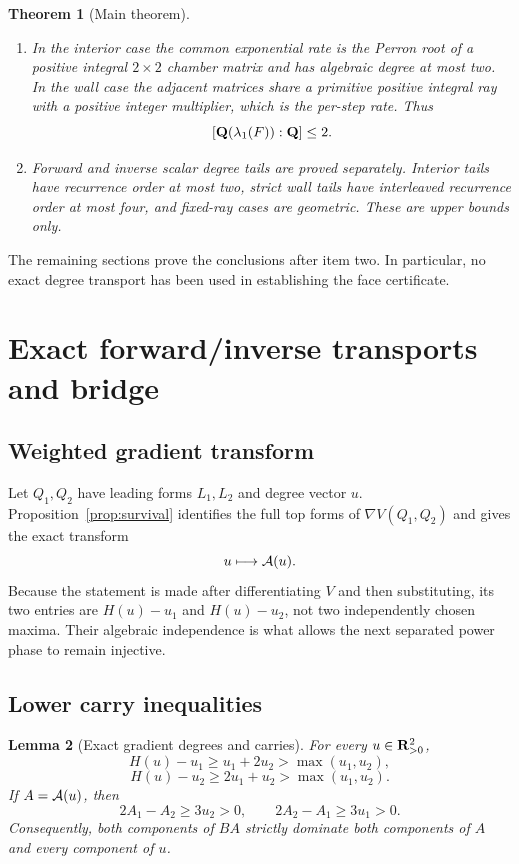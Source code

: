 \documentclass[11pt]{article}
\newtheorem{theorem}{Theorem}[section]
\newtheorem{lemma}[theorem]{Lemma}
\theoremstyle{definition}
\theoremstyle{remark}
\begin{document}
\begin{theorem}[Main theorem]
\begin{enumerate}
adjacent exponents off the wall and by the full face on it.  There is no
nontrivial numerical periodic orbit.
\item In the interior case the common exponential rate is the Perron root
of a positive integral \(2\times2\) chamber matrix and has algebraic
degree at most two.  In the wall case the adjacent matrices share a
primitive positive integral ray with a positive integer multiplier, which
is the per-step rate.  Thus
\[
[\mathbf{Q}(\lambda_1(F)):\mathbf{Q}]\leq2.
\]
\item Forward and inverse scalar degree tails are proved separately.
Interior tails have recurrence order at most two, strict wall tails have
interleaved recurrence order at most four, and fixed-ray cases are
geometric.  These are upper bounds only.
\end{enumerate}
\end{theorem}

The remaining sections prove the conclusions after item two.  In
particular, no exact degree transport has been used in establishing the
face certificate.

\section{Exact forward/inverse transports and bridge}

\subsection{Weighted gradient transform}

Let \(Q_1,Q_2\) have leading forms \(L_1,L_2\) and degree vector \(u\).
Proposition~\ref{prop:survival} identifies the full top forms of
\(\nabla V(Q_1,Q_2)\) and gives the exact transform
\[
u\longmapsto\mathcal{A}(u).
\]
Because the statement is made after differentiating \(V\) and then
substituting, its two entries are \(H(u)-u_1\) and \(H(u)-u_2\), not two
independently chosen maxima.  Their algebraic independence is what allows
the next separated power phase to remain injective.

\subsection{Lower carry inequalities}

\begin{lemma}[Exact gradient degrees and carries]\label{lem:carries}
For every \(u\in\mathbf{R}_{>0}^2\),
\[
H(u)-u_1\geq u_1+2u_2>\max(u_1,u_2),
\]
\[
H(u)-u_2\geq2u_1+u_2>\max(u_1,u_2).
\]
If \(A=\mathcal{A}(u)\), then
\[
2A_1-A_2\geq3u_2>0,\qquad
2A_2-A_1\geq3u_1>0.
\]
Consequently, both components of \(BA\) strictly dominate both components
of \(A\) and every component of \(u\).
\end{lemma}
\end{document}
